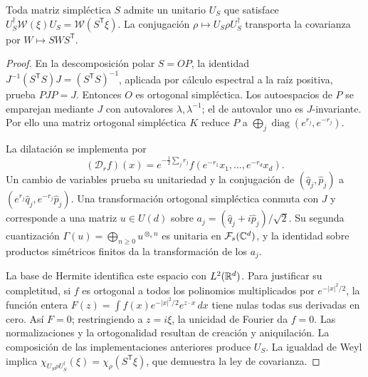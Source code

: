 \begin{lemma}
\label{app:lem:implementacion-simplectica}
Toda matriz simpléctica \(S\) admite un unitario \(U_S\) que satisface
\(U_S^\dagger\mathcal W(\xi)U_S=\mathcal W(S^{\mathsf T}\xi)\).
La conjugación \(\rho\mapsto U_S\rho U_S^\dagger\) transporta
la covarianza por \(W\mapsto SWS^{\mathsf T}\).
\end{lemma}
\begin{proof}
En la descomposición polar \(S=OP\), la identidad
\(J^{-1}(S^{\mathsf T}S)J=(S^{\mathsf T}S)^{-1}\), aplicada por
cálculo espectral a la raíz positiva, prueba \(PJP=J\).
Entonces \(O\) es ortogonal simpléctica. Los autoespacios de \(P\)
se emparejan mediante \(J\) con autovalores \(\lambda,\lambda^{-1}\);
el de autovalor uno es \(J\)-invariante. Por ello una matriz
ortogonal simpléctica \(K\) reduce \(P\) a
\(\bigoplus_j\operatorname{diag}(e^{r_j},e^{-r_j})\).

La dilatación se implementa por
\[
 (\mathcal D_rf)(x)=e^{-\frac12\sum_jr_j}
 f(e^{-r_1}x_1,\ldots,e^{-r_d}x_d).
\]
Un cambio de variables prueba su unitariedad y la conjugación de
\((\widehat q_j,\widehat p_j)\) a
\((e^{r_j}\widehat q_j,e^{-r_j}\widehat p_j)\).
Una transformación ortogonal simpléctica conmuta con \(J\) y
corresponde a una matriz \(u\in U(d)\) sobre
\(a_j=(\widehat q_j+i\widehat p_j)/\sqrt2\). Su segunda
cuantización \(\Gamma(u)=\bigoplus_{n\geq0}u^{\otimes_s n}\)
es unitaria en \(\mathcal F_s(\mathbb C^d)\), y la identidad sobre
productos simétricos finitos da la transformación de los \(a_j\).

La base de Hermite identifica este espacio con \(L^2(\mathbb R^d)\).
Para justificar su completitud, si \(f\) es ortogonal a todos los
polinomios multiplicados por \(e^{-|x|^2/2}\), la función entera
\(F(z)=\int f(x)e^{-|x|^2/2}e^{z\cdot x}\,dx\) tiene nulas
todas sus derivadas en cero. Así \(F=0\); restringiendo a
\(z=i\xi\), la unicidad de Fourier da \(f=0\). Las
normalizaciones y la ortogonalidad resultan de creación y aniquilación.
La composición de las implementaciones anteriores produce \(U_S\).
La igualdad de Weyl implica
\(\chi_{U_S\rho U_S^\dagger}(\xi)=\chi_\rho(S^{\mathsf T}\xi)\),
que demuestra la ley de covarianza.
\end{proof}

